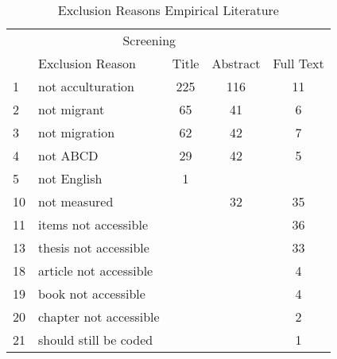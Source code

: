 \begin{table}
\begin{minipage}[t][\textheight][t]{\textwidth}

\caption{\label{tab:EmpiricalExclusion}Exclusion Reasons Empirical Literature}
\begin{tabular}[t]{llccc}
\toprule
\multicolumn{1}{c}{ } & \multicolumn{3}{c}{Screening} \\
\cmidrule(l{3pt}r{3pt}){2-4}
  & Exclusion Reason & Title & Abstract & Full Text\\
\midrule
1 & not acculturation & 225 & 116 & 11\\
2 & not migrant & 65 & 41 & 6\\
3 & not migration & 62 & 42 & 7\\
4 & not ABCD & 29 & 42 & 5\\
5 & not English & 1 &  & \\
10 & not measured &  & 32 & 35\\
11 & items not accessible &  &  & 36\\
13 & thesis not accessible &  &  & 33\\
18 & article not accessible &  &  & 4\\
19 & book not accessible &  &  & 4\\
20 & chapter not accessible &  &  & 2\\
21 & should still be coded &  &  & 1\\
\bottomrule
\end{tabular}
\end{minipage}
\end{table}
